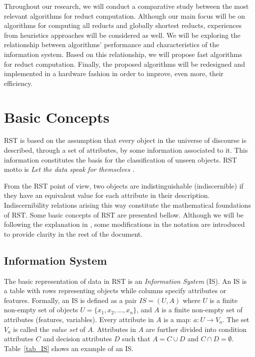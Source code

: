 \documentclass[authoryear,11pt]{elsarticle}
\begin{document}
  Throughout our research, we will conduct a comparative study between the most relevant algorithms for reduct 
  computation. Although our main focus will be on algorithms for computing all reducts and globally shortest
  reducts, experiences from heuristics approaches will be considered as well. We will be exploring the relationship 
  between algorithms' performance and characteristics of the information system. Based on this relationship,
  we will propose fast algorithms for reduct computation. Finally, the proposed algorithms 
  will be redesigned and implemented in a hardware fashion in order to improve, even more, their efficiency.  

\section{Basic Concepts}\label{basicConcepts}
  RST is based on the assumption that every object in the universe of discourse is described, through a 
  set of attributes, by some information associated to it. This information constitutes the basis for the
  classification of unseen objects. RST motto is \textit{Let the data speak for themselves} \citep{Tiwari14}.
  
  From the RST point of view, two objects are indistinguishable (indiscernible) if they have an equivalent 
  value for each attribute in their description. Indiscernibility relations arising this way constitute the
  mathematical foundations of RST. 
  Some basic concepts of RST are presented bellow. Although we will be following the explanation 
  in \citep{Polkowski00}, some modifications in the notation are introduced to provide clarity in the rest 
  of the document.
  
\subsection{Information System}
  The basic representation of data in RST is an \emph{Information System} (IS). An IS is a table with rows
  representing objects while columns specify attributes or features. Formally, an IS is defined as a pair
  $IS=(U,A)$ where $U$ is a finite non-empty set of objects $U=\lbrace x_1,x_2,...,x_n\rbrace$, and $A$ is a 
  finite non-empty set
  of attributes (features, variables). Every attribute in $A$ is a map: $a: U \rightarrow V_a$. The set $V_a$ is
  called the \textit{value set} of $A$. Attributes in $A$ are further divided into condition attributes $C$ and 
  decision attributes $D$ such that $A=C \cup D$ and $C \cap D =\emptyset$. 
  Table~\ref{tab_IS} shows an example of an IS.
  
\end{document}

